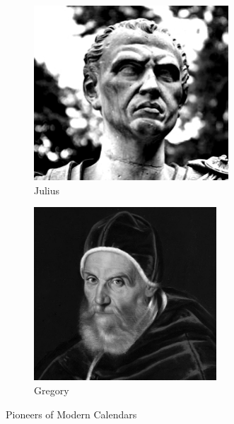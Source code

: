 \documentclass{article}
\begin{document}
\begin{figure}[ht]
    \centering
    \begin{subfigure}[b]{0.45\textwidth}
        \hfill
        \includegraphics[width=0.8\textwidth]{julius.jpg}
        \caption{Julius}
        \label{fig:julius}
    \end{subfigure}
    \begin{subfigure}[b]{0.45\textwidth}
        \includegraphics[width=0.75\textwidth]{gregory.PNG}
        \caption{Gregory}
        \label{fig:gregory}
    \end{subfigure}
    \caption{Pioneers of Modern Calendars}
    \label{fig:historical_figures}
\end{figure}
\end{document}
